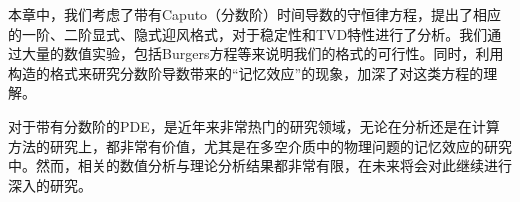 本章中，我们考虑了带有Caputo（分数阶）时间导数的守恒律方程，提出了相应的一阶、二阶显式、隐式迎风格式，对于稳定性和TVD特性进行了分析。我们通过大量的数值实验，包括Burgers方程等来说明我们的格式的可行性。同时，利用构造的格式来研究分数阶导数带来的“记忆效应”的现象，加深了对这类方程的理解。

对于带有分数阶的PDE，是近年来非常热门的研究领域，无论在分析还是在计算方法的研究上，都非常有价值，尤其是在多空介质中的物理问题的记忆效应的研究中。然而，相关的数值分析与理论分析结果都非常有限，在未来将会对此继续进行深入的研究。



%
%